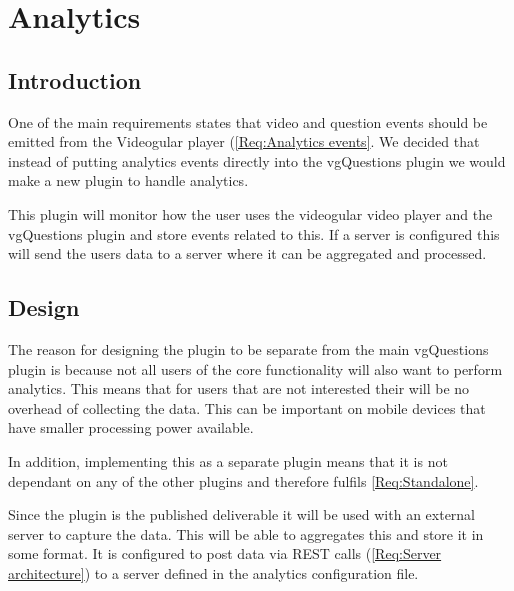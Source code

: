 
\chapter{Analytics} \label{Chapter: Analytics}

\begin{preamble}
\end{preamble}

\section{Introduction}

One of the main requirements states  that video and question events should be emitted from the Videogular player (\cref{Req:Analytics events}. We decided that instead of putting analytics events directly into the \gls{vgQuestions} plugin we would make a new plugin to handle analytics.

This plugin will monitor how the user uses the videogular video player and the vgQuestions plugin and store events related to this. If a server is configured this will send the users data to a server where it can be aggregated and processed.

\section{Design}

The reason for designing the plugin to be separate from the main vgQuestions plugin is because not all users of the core functionality will also want to perform analytics. This means that for users that are not interested their will be no overhead of collecting the data. This can be important on mobile devices that have smaller processing power available.

In addition, implementing this as a separate plugin means that it is not dependant on any of the other plugins and therefore fulfils \cref{Req:Standalone}.

Since the plugin is the published deliverable it will be used with an external server to capture the data. This will be able to aggregates this and store it in some format. It is configured to post data via \gls{REST} calls (\cref{Req:Server architecture}) to a server defined in the analytics configuration file.

